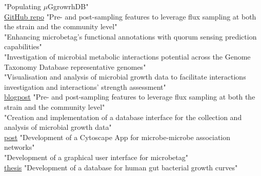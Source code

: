 {{}}
{"Populating $\mu$GgrowrhDB"}
{}
\\

{\href{https://github.com/SotirisTouliopoulos/dingo-stats}{GitHub repo}}
{"Pre- and post-sampling features to leverage flux sampling at both the strain and the community level"}
{}
\\

{{}}
{"Enhancing microbetag's functional annotations with quorum sensing prediction capabilities"}
{}
\\

{{}}
{"Investigation of microbial metabolic interactions potential across the Genome Taxonomy Database representative genomes"}
{}
\\

{{}}
{"Visualisation and analysis of microbial growth data to facilitate interactions investigation and interactions' strength assessment"}
{}
\\

{\href{https://sotiristouliopoulos.github.io/dingo/}{blogpost}}
{"Pre- and post-sampling features to leverage flux sampling at both the strain and the community level"}
{}
\\

{{}}
{"Creation and implementation of a database interface for the collection and analysis of microbial growth data"}
{}
\\

{\href{https://ermismd.github.io/MGG/}{post}}
{"Development of a Cytoscape App for microbe-microbe association networks"}
{}
\\

{{}}
{"Development of a graphical user interface for microbetag"}
{}
\\

{\href{https://kuleuven.limo.libis.be/discovery/fulldisplay?docid=alma9993527122501488&context=L&vid=32KUL_KUL:KULeuven&search_scope=All_Content&tab=all_content_tab&lang=en}{thesis}}
{"Development of a database for human gut bacterial growth curves"}
{}
\\

